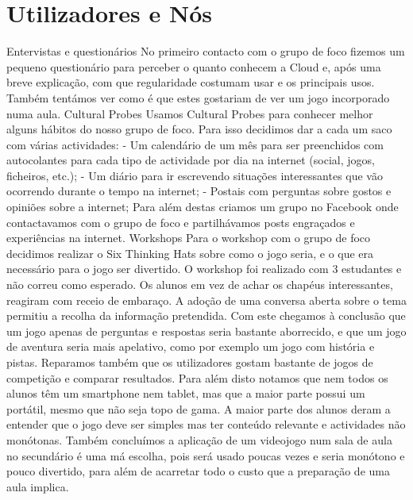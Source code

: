 \chapter{Utilizadores e Nós}
\label{chap:users} 
%
Entervistas e questionários
No primeiro contacto com o grupo de foco fizemos um pequeno questionário para perceber o quanto conhecem a Cloud e, após uma breve explicação, com que regularidade costumam usar e os principais usos. Também tentámos ver como é que estes gostariam de ver um jogo incorporado numa aula.\newline
\newline
\newline
Cultural Probes\newline
Usamos Cultural Probes para conhecer melhor alguns hábitos do nosso grupo de foco. Para isso decidimos dar a cada um saco com várias actividades: \newline
- Um calendário de um mês para ser preenchidos com autocolantes para cada tipo de actividade por dia na internet (social, jogos, ficheiros, etc.);\newline
- Um diário para ir escrevendo situações interessantes que vão ocorrendo durante o tempo na internet;\newline
- Postais com perguntas sobre gostos e opiniões sobre a internet;\newline
Para além destas criamos um grupo no Facebook onde contactavamos com o grupo de foco e partilhávamos posts engraçados e experiências na internet.\newline
\newline
\newline
Workshops\newline
Para o workshop com o grupo de foco decidimos realizar o Six Thinking Hats sobre como o jogo seria, e o que era necessário para o jogo ser divertido.\newline
O workshop foi realizado com 3 estudantes e não correu como esperado. Os alunos em vez de achar os chapéus interessantes, reagiram com receio de embaraço. A adoção de uma conversa aberta sobre o tema permitiu a recolha da informação pretendida.\newline
Com este chegamos à conclusão que um jogo apenas de perguntas e respostas seria bastante aborrecido, e que um jogo de aventura seria mais apelativo, como por exemplo um jogo com história e pistas. Reparamos também que os utilizadores gostam bastante de jogos de competição e comparar resultados.\newline
Para além disto notamos que nem todos os alunos têm um smartphone nem tablet, mas que a maior parte possui um portátil, mesmo que não seja topo de gama.
A maior parte dos alunos deram a entender que o jogo deve ser simples mas ter conteúdo relevante e actividades não monótonas. Também concluímos a aplicação de um videojogo num sala de aula no secundário é uma má escolha, pois será usado poucas vezes e seria monótono e pouco divertido, para além de acarretar todo o custo que a preparação de uma aula implica.\newline